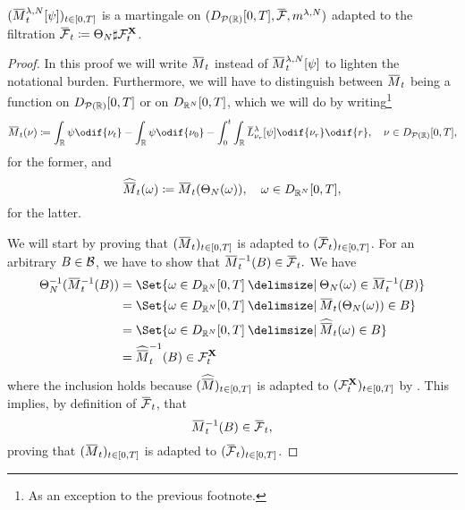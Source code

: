 \begin{proposition}\label{prop:emp-M-mart}
  \((\ol{M}_t^{\lambda, N}[\psi])_{t\in[0,T]}\) is a martingale on \((D_{\cP(\potspace)}[0,T], \ol{\cF}, \lawmu^{\lambda,N})\) adapted to the filtration \mbox{\( \ol{\cF}_t \coloneqq \Theta_N \sharp \cF_t^{\bm{X}} \)}.
\end{proposition}
\begin{proof}
  In this proof we will write \( \ol{M}_t \) instead of \( \ol{M}_t^{\lambda, N}[\psi] \) to lighten the notational burden.
  Furthermore, we will have to distinguish between \( \ol{M}_t \) being a function on \( D_{\mathcal{P}(\mathbb{R})}[0,T] \) or on \( D_{\mathbb{R}^N}[0,T] \), which we will do by writing\footnote{As an exception to the previous footnote.}
  \begin{equation}
    \ol{M}_t(\nu) \coloneqq \int_\potspace \psi \odif{\nu_t} - \int_\potspace \psi \odif{\nu_0}
    - \int_0^t \int_\potspace \ol{L}_{\nu_r}^{\lambda} [\psi] \odif{\nu_r} \odif{r},
    \quad \nu \in D_{\cP(\potspace)}[0,T],
  \end{equation}
  for the former, and
  \begin{equation}
    \widehat{\ol{M}}_t(\bm{\omega}) \coloneqq \ol{M}_t(\Theta_N(\bm{\omega})), \quad \bm{\omega} \in D_{\potspace^N}[0,T],
  \end{equation}
  for the latter.

  We will start by proving that \( (\ol{M}_t)_{t\in[0,T]} \) is adapted to \( (\ol{\cF}_t)_{t\in[0,T]} \).
  For an arbitrary \( B \in \mathcal{B} \), we have to show that
  \mbox{\begin{math}
      \ol{M}_t^{-1} (B) \in \ol{\cF}_t.
    \end{math}}
  We have
  \begin{equation}
    \begin{split}
      \Theta_N^{-1}(\ol{M}_t^{-1} (B))
       & = \Set{ \bm{\omega} \in D_{\potspace^N}[0,T] \given \Theta_N(\bm{\omega}) \in \ol{M}_t^{-1} (B) } \\
       & = \Set{ \bm{\omega} \in D_{\potspace^N}[0,T] \given \ol{M}_t(\Theta_N(\bm{\omega})) \in B }       \\
       & = \Set{ \bm{\omega} \in D_{\potspace^N}[0,T] \given \widehat{\ol{M}}_t(\bm{\omega}) \in B }       \\
       & = \widehat{\ol{M}}_t^{-1}(B) \in \cF_t^{\bm{X}}
    \end{split}
  \end{equation}
  where the inclusion holds because \( (\widehat{\ol{M}})_{t\in[0,T]} \) is adapted to \( (\mathcal{F}_t^{\mathbf{X}})_{t\in[0,T]} \) by .
  This implies, by definition of \( \ol{\cF}_t \), that
  \begin{equation}
    \ol{M}_t^{-1} (B) \in \ol{\cF}_t,
  \end{equation}
  proving that \( (\ol{M}_t)_{t\in[0,T]} \) is adapted to \( (\ol{\cF}_t)_{t\in[0,T]} \).


\end{proof}
